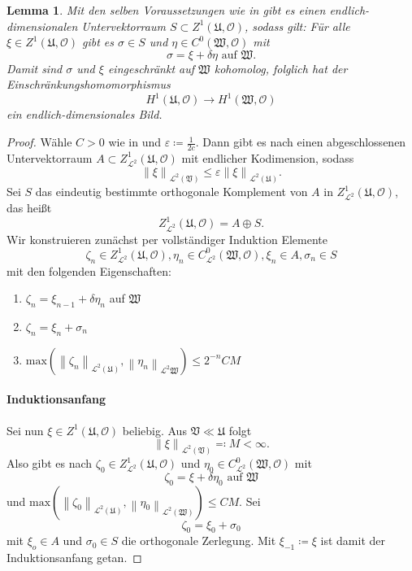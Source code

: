 \documentclass[11pt,a4paper]{scrartcl}
\theoremstyle{thm}
\newtheorem{lemma}{Lemma}[section]
\theoremstyle{def}
\theoremstyle{remark}
\newcommand{\norm}[1]{\left\lVert#1\right\rVert}
\begin{document}
\begin{lemma}
Mit den selben Voraussetzungen wie in  gibt es einen endlich-dimensionalen Untervektorraum $S\subset Z^1(\mathfrak{U},\mathcal{O})$, sodass gilt:
Für alle $\xi\in Z^1(\mathfrak{U},\mathcal{O})$ gibt es $\sigma\in S$ und $\eta\in C^0(\mathfrak{W},\mathcal{O})$ mit
\[
\sigma = \xi +\delta\eta\text{ auf } \mathfrak{W}.
\]
Damit sind $\sigma$ und $\xi$ eingeschränkt auf $\mathfrak{W}$ kohomolog, folglich hat der Einschränkungshomomorphismus 
\[
H^1(\mathfrak{U},\mathcal{O})\rightarrow H^1(\mathfrak{W},\mathcal{O})
\]
ein endlich-dimensionales Bild.
\end{lemma}
\begin{proof}

Wähle $C>0$ wie in  und $\varepsilon\coloneqq \frac{1}{2c}$. Dann gibt es nach  einen abgeschlossenen Untervektorraum $A\subset Z^1_{\mathcal{L}^2}(\mathfrak{U},\mathcal{O})$ mit endlicher Kodimension, sodass
\[
\norm{\xi}_{\mathcal{L}^2(\mathfrak{V})}\leq \varepsilon\norm{\xi}_{\mathcal{L}^2(\mathfrak{U})}.
\]
Sei $S$ das eindeutig bestimmte orthogonale Komplement von $A$ in $Z^1_{\mathcal{L}^2}(\mathfrak{U},\mathcal{O})$, das heißt
\[
Z^1_{\mathcal{L}^2}(\mathfrak{U},\mathcal{O}) = A\oplus S.
\]
Wir konstruieren zunächst per vollständiger Induktion Elemente 
\[
\zeta_n\in Z^1_{\mathcal{L}^2}(\mathfrak{U},\mathcal{O}),\eta_n\in C^0_{\mathcal{L}^2}(\mathfrak{W},\mathcal{O}),\xi_n\in A, \sigma_n\in S
\]
mit den folgenden Eigenschaften:
\begin{enumerate}
\item $\zeta_n = \xi_{n-1}+\delta \eta_n$ auf $\mathfrak{W}$
\item $\zeta_n = \xi_n+\sigma_n$
\item $\mathrm{max}\left(\norm{\zeta_n}_{\mathcal{L}^2(\mathfrak{U})},\norm{\eta_n}_{\mathcal{L}^2{\mathfrak{W}}}\right)\leq 2^{-n}CM$
\end{enumerate}
\paragraph*{Induktionsanfang}
Sei nun $\xi\in Z^1(\mathfrak{U},\mathcal{O})$ beliebig. Aus $\mathfrak{V}\ll \mathfrak{U}$ folgt
\[
\norm{\xi}_{\mathcal{L}^2(\mathfrak{V})}\eqqcolon M <\infty.
\]
Also gibt es nach  $\zeta_0\in Z^1_{\mathcal{L}^2}(\mathfrak{U},\mathcal{O})$ und $\eta_0\in C^0_{\mathcal{L}^2}(\mathfrak{W},\mathcal{O})$ mit
\[
\zeta_0 = \xi + \delta\eta_0 \text{ auf } \mathfrak{W}
\]
und $\mathrm{max}(\norm{\zeta_0}_{\mathcal{L}^2(\mathfrak{U})},\norm{\eta_0}_{\mathcal{L}^2(\mathfrak{W})})\leq CM.$
Sei
\[
\zeta_0 = \xi_0+\sigma_0
\]
mit $\xi_o\in A$ und $\sigma_0\in S$ die orthogonale Zerlegung.
Mit $\xi_{-1}\coloneqq \xi$ ist damit der Induktionsanfang getan.

\end{proof}
\end{document}
